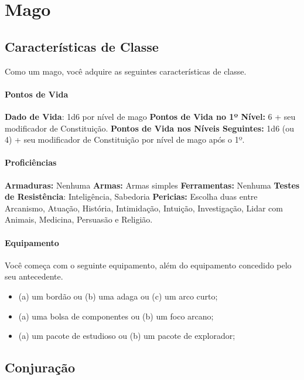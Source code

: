 \documentclass{RPG_Adventure}[2021/10/20]
\begin{document}
\chapter{Mago}%
\label{cha:mago}
\begin{multicols}{2}

\section*{Características de Classe}%

Como um mago, você adquire as seguintes características de classe.

\subsubsection{Pontos de Vida}%

\noindent\textbf{Dado de Vida}: 1d6 por nível de mago \nl
\textbf{Pontos de Vida no 1º Nível:} 6 + seu modificador de Constituição. \nl
\textbf{Pontos de Vida nos Níveis Seguintes:} 1d6 (ou 4) + seu modificador de
Constituição por nível de mago após o 1º.

\subsubsection{Proficiências}%

\noindent\textbf{Armaduras:} Nenhuma \nl
\textbf{Armas:} Armas simples \nl
\textbf{Ferramentas:} Nenhuma \jump
\textbf{Testes de Resistência}: Inteligência, Sabedoria \nl
\textbf{Pericias:} Escolha duas entre Arcanismo, Atuação, História, Intimidação,
Intuição, Investigação, Lidar com Animais, Medicina, Persuasão e Religião.

\subsubsection{Equipamento}%

Você começa com o seguinte equipamento, além do equipamento concedido pelo seu
antecedente.
\begin{itemize}
    \item (a) um bordão ou (b) uma adaga ou (c) um arco curto;
    \item (a) uma bolsa de componentes ou (b) um foco arcano;
    \item (a) um pacote de estudioso ou (b) um pacote de explorador;
\end{itemize}

\section*{Conjuração}%


\end{multicols}
\end{document}
